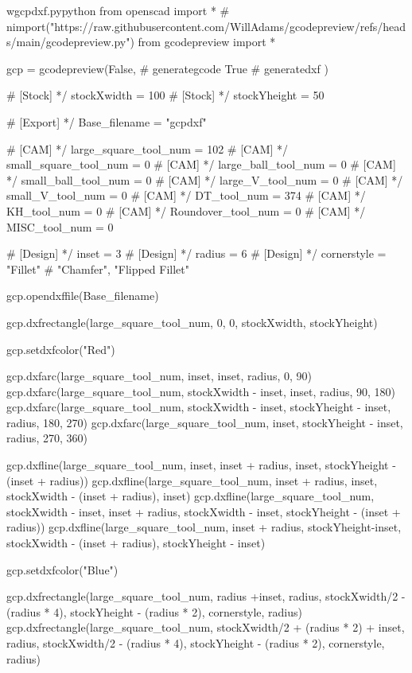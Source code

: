 \documentclass{ltxdoc}
\begin{document}
\lstset{firstnumber=1}%
\begin{writecode}{w}{gcpdxf.py}{python}
from openscad import *
# nimport("https://raw.githubusercontent.com/WillAdams/gcodepreview/refs/heads/main/gcodepreview.py")
from gcodepreview import *

gcp = gcodepreview(False, # generategcode
                   True   # generatedxf
                   )

# [Stock] */
stockXwidth = 100
# [Stock] */
stockYheight = 50

# [Export] */
Base_filename = "gcpdxf"


# [CAM] */
large_square_tool_num = 102
# [CAM] */
small_square_tool_num = 0
# [CAM] */
large_ball_tool_num = 0
# [CAM] */
small_ball_tool_num = 0
# [CAM] */
large_V_tool_num = 0
# [CAM] */
small_V_tool_num = 0
# [CAM] */
DT_tool_num = 374
# [CAM] */
KH_tool_num = 0
# [CAM] */
Roundover_tool_num = 0
# [CAM] */
MISC_tool_num = 0

# [Design] */
inset = 3
# [Design] */
radius = 6
# [Design] */
cornerstyle = "Fillet"  # "Chamfer", "Flipped Fillet"

gcp.opendxffile(Base_filename)

gcp.dxfrectangle(large_square_tool_num, 0, 0, stockXwidth, stockYheight)

gcp.setdxfcolor("Red")

gcp.dxfarc(large_square_tool_num, inset, inset, radius,  0, 90)
gcp.dxfarc(large_square_tool_num, stockXwidth - inset, inset, radius, 90, 180)
gcp.dxfarc(large_square_tool_num, stockXwidth - inset, stockYheight - inset, radius, 180, 270)
gcp.dxfarc(large_square_tool_num, inset, stockYheight - inset, radius, 270, 360)

gcp.dxfline(large_square_tool_num, inset, inset + radius, inset, stockYheight - (inset + radius))
gcp.dxfline(large_square_tool_num, inset + radius, inset, stockXwidth - (inset + radius), inset)
gcp.dxfline(large_square_tool_num, stockXwidth - inset, inset + radius, stockXwidth - inset, stockYheight - (inset + radius))
gcp.dxfline(large_square_tool_num, inset + radius, stockYheight-inset, stockXwidth - (inset + radius), stockYheight - inset)

gcp.setdxfcolor("Blue")

gcp.dxfrectangle(large_square_tool_num, radius +inset, radius, stockXwidth/2 - (radius * 4), stockYheight - (radius * 2), cornerstyle, radius)
gcp.dxfrectangle(large_square_tool_num, stockXwidth/2 + (radius * 2) + inset, radius, stockXwidth/2 - (radius * 4), stockYheight - (radius * 2), cornerstyle, radius)


\end{writecode}
\end{document}
